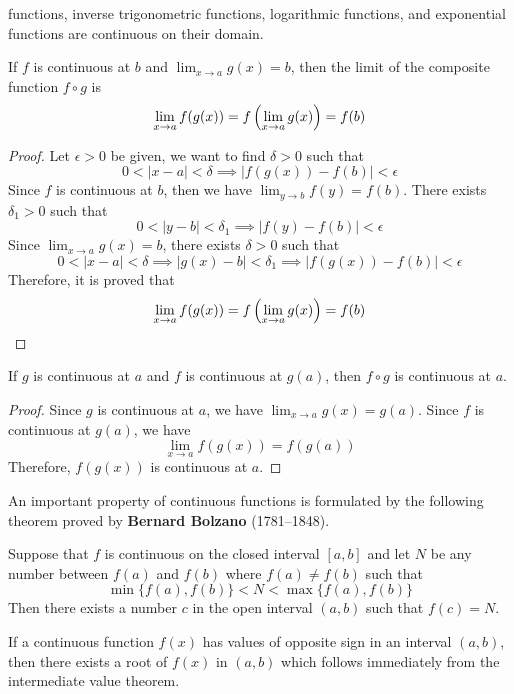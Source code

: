 functions, inverse trigonometric functions, logarithmic functions, and
exponential functions are continuous on their domain.
\begin{theorem}
    If \(f\) is continuous at \(b\) and \(\lim_{x\to a}g(x)=b\), then
    the limit of the composite function \(f\circ g\) is
    \[\lim_{x\to a}f(g(x))=f\left(\lim_{x\to a}g(x)\right)=f(b)\qedhere\]
\end{theorem}
\begin{proof}
    Let \(\epsilon>0\) be given, we want to find \(\delta>0\) such that
    \[0<|x-a|<\delta\implies|f(g(x))-f(b)|<\epsilon\]
    Since \(f\) is continuous at \(b\),
    then we have \(\lim_{y\to b}f(y)=f(b)\).
    There exists \(\delta_1>0\) such that
    \[0<|y-b|<\delta_1\implies|f(y)-f(b)|<\epsilon\]
    Since \(\lim_{x\to a}g(x)=b\), there exists \(\delta>0\) such that
    \[0<|x-a|<\delta\implies|g(x)-b|<\delta_1\implies|f(g(x))-f(b)|<\epsilon\]
    Therefore, it is proved that
    \[\lim_{x\to a}f(g(x))=f\left(\lim_{x\to a}g(x)\right)=f(b)\qedhere\]
\end{proof}
\begin{theorem}
    If \(g\) is continuous at \(a\) and \(f\) is continuous at \(g(a)\), then
    \(f\circ g\) is continuous at \(a\).
\end{theorem}
\begin{proof}
    Since \(g\) is continuous at \(a\), we have \(\lim_{x\to a}g(x)=g(a)\).
    Since \(f\) is continuous at \(g(a)\), we have
    \[\lim_{x\to a}f(g(x))=f(g(a))\]
    Therefore, \(f(g(x))\) is continuous at \(a\).
\end{proof}
An important property of continuous functions is formulated by the following
theorem proved by \textbf{Bernard Bolzano} (1781--1848).
\begin{theorem}
    Suppose that \(f\) is continuous on the closed interval \([a,b]\) and let
    \(N\) be any number between \(f(a)\) and \(f(b)\) where \(f(a)\neq f(b)\)
    such that \[\min\{f(a),f(b)\}<N<\max\{f(a),f(b)\}\]
    Then there exists a number \(c\) in the open interval \((a,b)\) such that
    \(f(c)=N\).
\end{theorem}
If a continuous function \(f(x)\) has values of opposite sign in an interval
\((a,b)\), then there exists a root of \(f(x)\) in \((a,b)\) which follows
immediately from the intermediate value theorem.